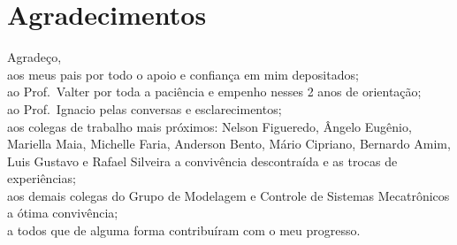 
\chapter*{Agradecimentos}

\noindent Agradeço,\\[2mm]
aos meus pais por todo o apoio e confiança em mim depositados;\\[2mm]
ao Prof.\ Valter por toda a paciência e empenho nesses 2 anos de orientação;\\[2mm]
ao Prof.\ Ignacio pelas conversas e esclarecimentos;\\[2mm]
aos colegas de trabalho mais próximos: Nelson Figueredo, Ângelo Eugênio,
Mariella Maia, Michelle Faria, Anderson Bento, Mário Cipriano, Bernardo Amim,
Luis Gustavo e Rafael Silveira a convivência descontraída e as trocas de
experiências;\\[2mm]
aos demais colegas do Grupo de Modelagem e Controle de Sistemas Mecatrônicos a
ótima convivência;\\[2mm]
a todos que de alguma forma contribuíram com o meu progresso.

\thispagestyle{plain}
\cleardoublepage{}
